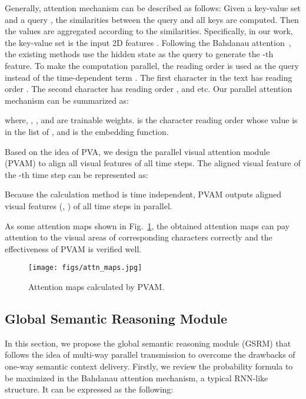 \documentclass[10pt,twocolumn,letterpaper]{article}
\begin{document}
\begin{CJK}{UTF8}{gbsn}
Generally, attention mechanism can be described as follows: Given a key-value set  and a query ,  the similarities between the query  and all keys  are computed. Then the values  are aggregated according to the similarities. Specifically, in our work, the key-value set is the input 2D features .  
Following the Bahdanau attention~\cite{bahdanau2014neural}, the existing methods use the hidden state  as the query to generate the -th feature. To make the computation parallel, the reading order is used as the query instead of the time-dependent term .
The first character in the text has reading order . The second character has reading order , and etc. Our parallel attention mechanism can be summarized as:

where, , , and  are trainable weights.  is the character reading order whose value is in the list of , and  is the embedding function.

Based on the idea of PVA, we design the parallel visual attention module (PVAM) to align all visual features of all time steps. 
The aligned visual feature of the -th time step can be represented as:

Because the calculation method is time independent, PVAM outputs aligned visual features (, ) of all time steps in parallel.

As some attention maps shown in Fig.~\ref{fig:attenmap}, the obtained attention maps can pay attention to the visual areas of corresponding characters correctly and the effectiveness of PVAM is verified well. \begin{figure}[!h]
\begin{center}
\texttt{[image: figs/attn\_maps.jpg]}
\end{center}
\vspace{-3mm}
\caption{Attention maps calculated by PVAM.}
\label{fig:attenmap}
\vspace{-5mm}
\end{figure}

\subsection{Global Semantic Reasoning Module}
In this section, we propose the global semantic reasoning module (GSRM) that follows the idea of multi-way parallel transmission to overcome the drawbacks of one-way semantic context delivery.
Firstly, we review the probability formula to be maximized in the Bahdanau attention mechanism, a typical RNN-like structure. It can be expressed as the following:


\end{CJK}
\end{document}
